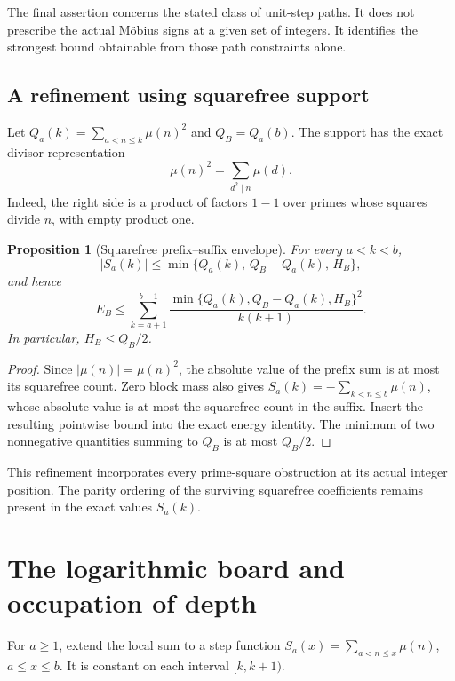 \documentclass[11pt]{article}
\newtheorem{proposition}[theorem]{Proposition}
\theoremstyle{definition}
\theoremstyle{remark}
\begin{document}
The final assertion concerns the stated class of unit-step paths. It does not prescribe the actual M\"obius signs at a given set of integers. It identifies the strongest bound obtainable from those path constraints alone.

\subsection{A refinement using squarefree support}

Let $Q_a(k)=\sum_{a<n\le k}\mu(n)^2$ and $Q_B=Q_a(b)$. The support has the exact divisor representation
\begin{equation}\label{eq:musq}
\mu(n)^2=\sum_{d^2\mid n}\mu(d).
\end{equation}
Indeed, the right side is a product of factors $1-1$ over primes whose squares divide $n$, with empty product one.

\begin{proposition}[Squarefree prefix--suffix envelope]
For every $a<k<b$,
\begin{equation}
|S_a(k)|\le\min\{Q_a(k),\,Q_B-Q_a(k),\,H_B\},
\end{equation}
and hence
\begin{equation}
E_B\le\sum_{k=a+1}^{b-1}\frac{\min\{Q_a(k),Q_B-Q_a(k),H_B\}^2}{k(k+1)}.
\end{equation}
In particular, $H_B\le Q_B/2$.
\end{proposition}

\begin{proof}
Since $|\mu(n)|=\mu(n)^2$, the absolute value of the prefix sum is at most its squarefree count. Zero block mass also gives $S_a(k)=-\sum_{k<n\le b}\mu(n)$, whose absolute value is at most the squarefree count in the suffix. Insert the resulting pointwise bound into the exact energy identity. The minimum of two nonnegative quantities summing to $Q_B$ is at most $Q_B/2$.
\end{proof}

This refinement incorporates every prime-square obstruction at its actual integer position. The parity ordering of the surviving squarefree coefficients remains present in the exact values $S_a(k)$.

\section{The logarithmic board and occupation of depth}\label{sec:logboard}

For $a\ge1$, extend the local sum to a step function $S_a(x)=\sum_{a<n\le x}\mu(n)$, $a\le x\le b$. It is constant on each interval $[k,k+1)$.
\end{document}
